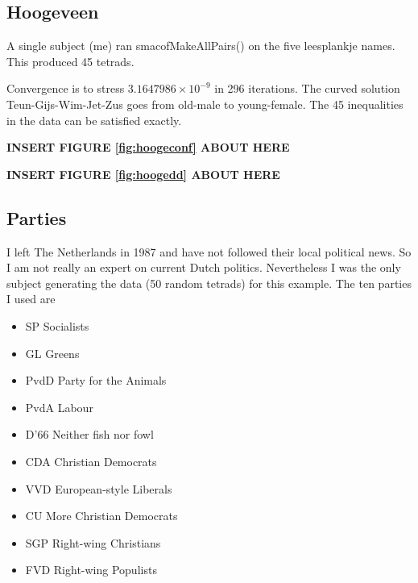 \documentclass[
  12pt,
]{article}
\providecommand{\tightlist}{%
  \setlength{\itemsep}{0pt}\setlength{\parskip}{0pt}}
\begin{document}
\subsection{Hoogeveen}\label{hoogeveen}

A single subject (me) ran smacofMakeAllPairs() on the five leesplankje names. This
produced 45 tetrads.

Convergence is to stress \ensuremath{3.1647986\times 10^{-9}} in 296 iterations. The curved solution
Teun-Gijs-Wim-Jet-Zus goes from old-male to young-female. The 45 inequalities
in the data can be satisfied exactly.

\begin{greybox}

\begin{center}
\textbf{INSERT FIGURE \ref{fig:hoogeconf} ABOUT HERE}

\end{center}

\end{greybox}

\begin{greybox}

\begin{center}
\textbf{INSERT FIGURE \ref{fig:hoogedd} ABOUT HERE}

\end{center}

\end{greybox}

\subsection{Parties}\label{parties}

I left The Netherlands in 1987 and have not followed their local political news. So I am not really an expert on current Dutch politics. Nevertheless I was the only subject generating the data (50 random tetrads) for this example. The ten parties I used are

\begin{itemize}
\tightlist
\item
  SP Socialists
\item
  GL Greens
\item
  PvdD Party for the Animals
\item
  PvdA Labour
\item
  D'66 Neither fish nor fowl
\item
  CDA Christian Democrats
\item
  VVD European-style Liberals
\item
  CU More Christian Democrats
\item
  SGP Right-wing Christians
\item
  FVD Right-wing Populists
\end{itemize}
\end{document}
